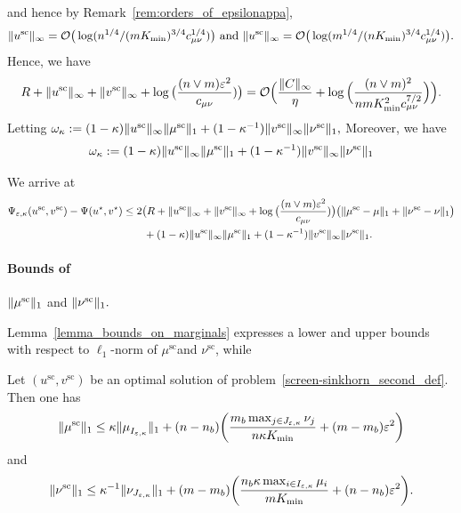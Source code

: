 and hence by Remark~\ref{rem:orders_of_epsilonappa}, 
\begin{equation*}
\|u^{\text{sc}}\|_\infty = \mathcal{O}\big(\log({n^{1/4}}/{(mK_{\min})^{3/4}c_{\mu\nu}^{1/4}})\big) \text{ and }\|u^{\text{sc}}\|_\infty =\mathcal{O}\big(\log({m^{1/4}}/{(nK_{\min})^{3/4}c_{\mu\nu}^{1/4}})\big).
\end{equation*}
Hence, we have 
\begin{align*}
R + \|u^{\text{sc}}\|_\infty  + \|v^{\text{sc}}\|_\infty + \log\big(\frac{(n\vee m)\varepsilon^2}{c_{\mu\nu}})\big) = \mathcal{O}\Big(\frac{\|C\|_\infty}{\eta} + \log\Big(\frac{(n\vee m)^2}{nmK_{\min}^{2}c_{\mu\nu}^{7/2}}\Big)\Big).
\end{align*}
Letting $\omega_{\kappa} := (1- \kappa)\|{u}^{\text{sc}}\|_\infty\|{\mu}^{\text{sc}}\|_1 + (1- \kappa^{-1})\|{v}^{\text{sc}}\|_\infty\|{\nu}^{\text{sc}}\|_1,$
Moreover, we have 
\begin{align*}
\omega_{\kappa} := (1- \kappa)\|{u}^{\text{sc}}\|_\infty\|{\mu}^{\text{sc}}\|_1 + (1- \kappa^{-1})\|{v}^{\text{sc}}\|_\infty\|{\nu}^{\text{sc}}\|_1
\end{align*}


We arrive at 
\begin{align}
\Psi_{\varepsilon, \kappa}(u^{\text{sc}} ,v^{\text{sc}}) -\Psi(u^\star, v^\star) 
&\leq 2\big(R + \|u^{\text{sc}}\|_\infty +  \|v^{\text{sc}}\|_\infty + \log\big(\frac{(n\vee m)\varepsilon^2}{c_{\mu\nu}})\big) \big(\|\mu^{\text{sc}} - \mu\|_1+ \|\nu^{\text{sc}} - \nu\|_1\big)\nonumber\\
&\qquad + (1- \kappa)\|{u}^{\text{sc}}\|_\infty\|{\mu}^{\text{sc}}\|_1 + (1- \kappa^{-1})\|{v}^{\text{sc}}\|_\infty\|{\nu}^{\text{sc}}\|_1.\label{post_bounds_induction_2}
\end{align}


\paragraph{Bounds of}$\|\mu^{\text{sc}}\|_1$  and $\|\nu^{\text{sc}}\|_1.$ 

Lemma~\ref{lemma_bounds_on_marginals} expresses a lower and upper bounds with respect to $\ell_1$-norm of $\mu^{\text{sc}}$and $\nu^{\text{sc}}$, while 
\begin{lemma}
\label{lemma_bounds_on_marginals}
Let $(u^{\text{sc}}, v^{\text{sc}})$ be an optimal solution of problem~\eqref{screen-sinkhorn_second_def}.
Then one has 
\begin{align*}
\|\mu^{\text{sc}}\|_1 \leq \kappa \|\mu_{I_{\varepsilon,\kappa}}^{\text{}}\|_1 + (n-n_b) \bigg(\frac{m_b\max_{j \in J_{\varepsilon,\kappa}} \nu_j}{n\kappa K_{\min}} + (m-m_b)\varepsilon
 ^2 \bigg)
\end{align*}
and 
\begin{align*}
\|\nu^{\text{sc}}\|_1  \leq \kappa^{-1} \|\nu_{J_{\varepsilon,\kappa}}\|_1 + (m-m_b)\bigg(\frac{n_b\kappa \max_{i\in I_{\varepsilon,\kappa}}\mu_i}{m K_{\min}} + (n-n_b)\varepsilon^2\bigg).
\end{align*}
\end{lemma}


